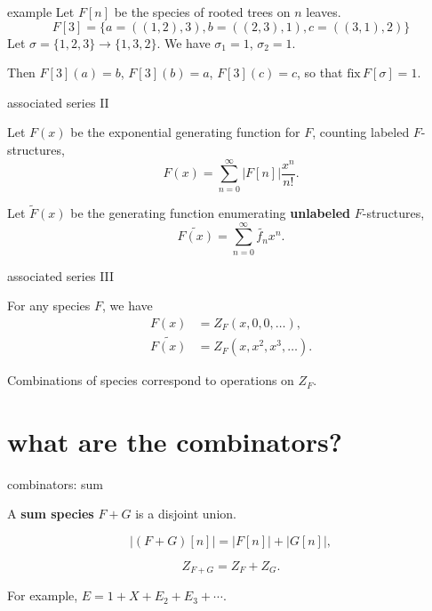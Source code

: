 \documentclass{beamer}
\begin{document}
\begin{frame}{example}
  Let $F[n]$ be the species of rooted trees on $n$ leaves.
  \[
    F[3] = \big\{a = ((1,2),3), b=((2,3),1), c = ((3,1),2)\big\}
  \]
  Let $\sigma = \{1,2,3\} \to \{1,3,2\}$. We have $\sigma_1 = 1$, $\sigma_2 = 1$.

  Then $F[3](a) = b$, $F[3](b) = a$, $F[3](c) = c$, so that $\mathrm{fix}\,F[\sigma] = 1$.
\end{frame}

\begin{frame}{associated series II}

  Let $F(x)$ be the exponential generating function for $F$, counting labeled $F$-structures,
  \[
    F(x) = \sum_{n=0}^\infty |F[n]| \frac{x^n}{n!}.
  \]

  Let $\widetilde{F}(x)$ be the generating function enumerating \textbf{unlabeled} $F$-structures,
  \[
    \widetilde{F(x)} = \sum_{n=0}^\infty \widetilde{f_n} x^n.
  \]
\end{frame}

\begin{frame}{associated series III}

  \begin{theorem}
    For any species $F$, we have
    \begin{align*}
      F(x)             & = Z_F(x,0,0,\ldots),     \\
      \widetilde{F(x)} & = Z_F(x,x^2,x^3,\ldots).
    \end{align*}
  \end{theorem} \pause

  Combinations of species correspond to operations on $Z_F$.
\end{frame}

\section{what are the combinators?}

\begin{frame}{combinators: sum}

  A \textbf{sum species} $F + G$ is a disjoint union. \pause

  \[|(F+G)[n]| = |F[n]| + |G[n]|, \]

  \[
    Z_{F+G} = Z_F + Z_G.
  \] \pause

  For example, $E = 1 + X + E_2 + E_3 + \cdots$.

\end{frame}
\end{document}
